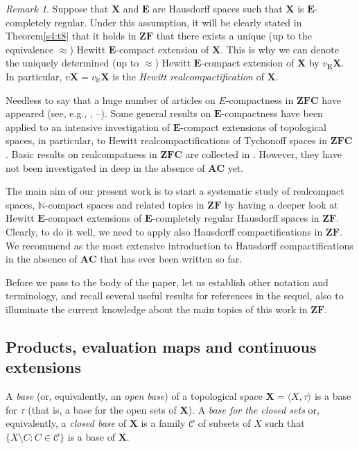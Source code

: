 \documentclass[12pt,twoside,leqno]{article}
\theoremstyle{plain}
\theoremstyle{definition}
\theoremstyle{remark}
\newtheorem{remark}[theorem]{Remark}
\begin{document}
\begin{remark}
	\label{s1:r6}
	Suppose that $\mathbf{X}$ and $\mathbf{E}$ are Hausdorff spaces such that $\mathbf{X}$ is $\mathbf{E}$-completely regular. Under this assumption, it will be clearly stated in Theorem\ref{s4:t8} that it holds in $\mathbf{ZF}$ that there exists a unique (up to the equivalence $\approx$) Hewitt $\mathbf{E}$-compact extension of $\mathbf{X}$. This is why we can denote the uniquely determined (up to $\approx$) Hewitt $\mathbf{E}$-compact extension of $\mathbf{X}$ by $v_{\mathbf{E}}\mathbf{X}$. In particular, $v\mathbf{X}=v_{\mathbb{R}}\mathbf{X}$ is the \emph{Hewitt realcompactification} of $\mathbf{X}$.
\end{remark}

Needless to say that a huge number of articles on $E$-compactness in $\mathbf{ZFC}$ have appeared (see, e.g., \cite{enmr}, \cite{mr0}--\cite{mr5}). Some general results on $\mathbf{E}$-compactness have been applied to an intensive investigation of $\mathbf{E}$-compact extensions of topological spaces, in particular, to  Hewitt realcompactifications of Tychonoff spaces in $\mathbf{ZFC}$. Basic results on realcompatness in $\mathbf{ZFC}$ are collected in \cite[Chapter 3.11]{en}.  However, they have not been investigated in deep in the absence of $\mathbf{AC}$ yet. 

The main aim of our present work is to start a systematic study of realcompact spaces, $\mathbb{N}$-compact spaces and related topics in $\mathbf{ZF}$ by having a deeper look at Hewitt $\mathbf{E}$-compact extensions of $\mathbf{E}$-completely regular Hausdorff spaces in $\mathbf{ZF}$. Clearly, to do it well, we need to apply also Hausdorff compactifications in $\mathbf{ZF}$.  We recommend \cite{kw1} as the most extensive introduction to Hausdorff compactifications in the absence of $\mathbf{AC}$ that has ever been written so far. 

Before we pass to the body of the paper, let us establish other notation and terminology, and recall several useful results for references in the sequel, also to illuminate the current knowledge about the main topics of this work in $\mathbf{ZF}$. 

\subsection{Products, evaluation maps and continuous extensions}
\label{s1.2}

A \emph{base} (or, equivalently, an \emph{open base}) of a topological space $\mathbf{X}=\langle X, \tau\rangle$ is a base for $\tau$ (that is, a base for the open sets of $\mathbf{X}$). A \emph{ base for the closed sets} or, equivalently, a \emph{closed base} of $\mathbf{X}$ is a family $\mathcal{C}$ of subsets of $X$ such that $\{X\setminus C: C\in\mathcal{C}\}$ is a base of $\mathbf{X}$. 
\end{document}
